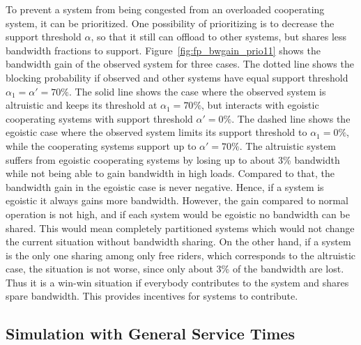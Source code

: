 To prevent a system from being congested from an overloaded cooperating system, it can be prioritized. One possibility of prioritizing is to decrease the support threshold $\alpha$, so that it still can offload to other systems, but shares less bandwidth fractions to support. Figure~\ref{fig:fp_bwgain_prio11} shows the bandwidth gain of the observed system for three cases. The dotted line shows the blocking probability if observed and other systems have equal support threshold $\alpha_1=\alpha'=70\%$. The solid line shows the case where the observed system is altruistic and keeps its threshold at $\alpha_1=70\%$, but interacts with egoistic cooperating systems with support threshold $\alpha'=0\%$. The dashed line shows the egoistic case where the observed system limits its support threshold to $\alpha_1=0\%$, while the cooperating systems support up to $\alpha'=70\%$. The altruistic system suffers from egoistic cooperating systems by losing up to about 3\% bandwidth while not being able to gain bandwidth in high loads. Compared to that, the bandwidth gain in the egoistic case is never negative.
Hence, if a system is egoistic it always gains more bandwidth. However, the gain compared to normal operation is not high, and if each system would be egoistic no bandwidth can be shared. This would mean completely partitioned systems which would not change the current situation without bandwidth sharing.
On the other hand, if a system is the only one sharing among only free riders, which corresponds to the altruistic case, the situation is not worse, since only about 3\% of the bandwidth are lost.
Thus it is a win-win situation if everybody contributes to the system and shares spare bandwidth.
This provides incentives for systems to contribute.

\subsection{Simulation with General Service Times}\label{sec:simgeneral}

